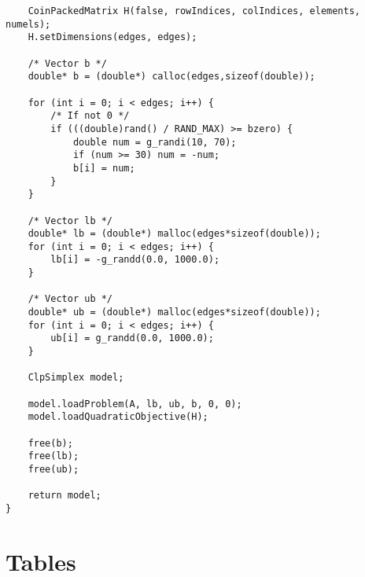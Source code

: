 \begin{verbatim}
    CoinPackedMatrix H(false, rowIndices, colIndices, elements, numels);
    H.setDimensions(edges, edges);

    /* Vector b */
    double* b = (double*) calloc(edges,sizeof(double));

    for (int i = 0; i < edges; i++) {
        /* If not 0 */
        if (((double)rand() / RAND_MAX) >= bzero) {
            double num = g_randi(10, 70);
            if (num >= 30) num = -num;
            b[i] = num;
        }
    }

    /* Vector lb */
    double* lb = (double*) malloc(edges*sizeof(double));
    for (int i = 0; i < edges; i++) {
        lb[i] = -g_randd(0.0, 1000.0);
    }

    /* Vector ub */
    double* ub = (double*) malloc(edges*sizeof(double));
    for (int i = 0; i < edges; i++) {
        ub[i] = g_randd(0.0, 1000.0);
    }

    ClpSimplex model;

    model.loadProblem(A, lb, ub, b, 0, 0);
    model.loadQuadraticObjective(H);

    free(b);
    free(lb);
    free(ub);

    return model;
}
\end{verbatim}

\chapter{Tables}
